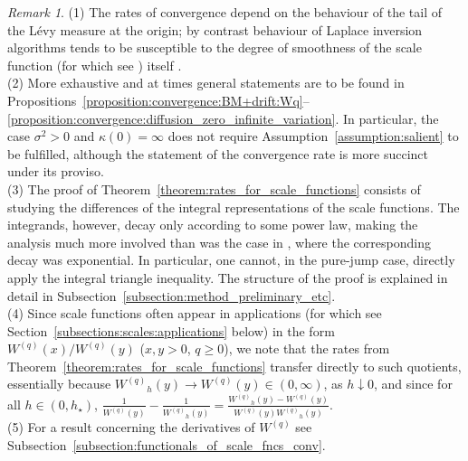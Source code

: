 \documentclass[pdftex,oneside,11pt,reqno]{amsart}
\theoremstyle{definition}
\theoremstyle{theorem}
\theoremstyle{remark}
\newtheorem{remark}{Remark}[section]
\numberwithin{equation}{section}
\numberwithin{definition}{section}
\begin{document}
\begin{remark}
\noindent (1) The rates of convergence depend on the behaviour of the tail of the L\'evy measure at the origin; by contrast behaviour of Laplace inversion algorithms tends to be susceptible to the degree of smoothness of the scale function (for which see \cite{kyprianou:smoothness}) itself \cite{abate_unified}.\\
\noindent (2) More exhaustive and at times general statements are to be found in
Propositions~\ref{proposition:convergence:BM+drift:Wq}--
\ref{proposition:convergence:diffusion_zero_infinite_variation}. In particular, the case ${\sigma^2}>0$ and $\kappa(0)=\infty$ does not require
Assumption~\ref{assumption:salient} to be fulfilled, although the statement of
the convergence rate is more succinct under its proviso.\\
\noindent (3) The proof of Theorem~\ref{theorem:rates_for_scale_functions} consists of studying the differences of the integral representations of the scale functions. 
The integrands, however, decay only according to some power law, making the analysis much more involved than was the case in \cite{vidmarmijatovicsaul}, where the corresponding decay was exponential. In particular, one cannot, in the pure-jump case, directly apply the integral triangle inequality. The structure of the proof is explained in detail in Subsection~\ref{subsection:method_preliminary_etc}. \\
\noindent (4) Since scale functions often appear in applications (for which see Section~\ref{subsections:scales:applications}
below) in the form ${W^{(q)}}(x)/{W^{(q)}}(y)$ ($x,y>0$, $q\geq 0$), we note that the rates from Theorem~\ref{theorem:rates_for_scale_functions}
transfer directly to such quotients, essentially because 
${W^{(q)}}_h(y)\to {W^{(q)}}(y)\in (0,\infty)$, as $h\downarrow 0$, and since for all $h\in (0,h_\star)$, $\frac{1}{{W^{(q)}}(y)}-\frac{1}{{W^{(q)}}_h(y)}=\frac{{W^{(q)}}_h(y)-{W^{(q)}}(y)}{{W^{(q)}}(y){W^{(q)}}_h(y)}$.\\
\noindent (5) For a result concerning the derivatives of ${W^{(q)}}$  see Subsection~\ref{subsection:functionals_of_scale_fncs_conv}.
\end{remark}
\end{document}

